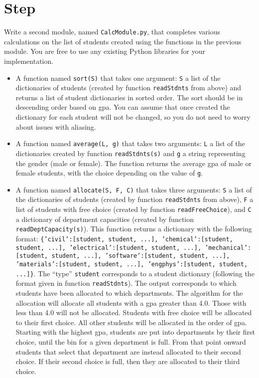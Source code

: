 \documentclass[12pt]{article}
\newcounter{stepnum}
\begin{document}
\section *{Step  \thestepnum}

Write a second module, named {\tt CalcModule.py}, that completes various
calculations on the list of students created using the functions in the previous
module.  You are free to use any existing Python libraries for your
implementation.

\begin{itemize}

\item A function named {\tt sort(S)} that takes one argument: \texttt{S} a list
  of the dictionaries of students (created by function \texttt{readStdnts} from
  above) and returns a list of student dictionaries in sorted order.  The sort
  should be in descending order based on gpa.  You can assume that once created
  the dictionary for each student will not be changed, so you do not need to
  worry about issues with aliasing.

\item A function named {\tt average(L, g)} that takes two arguments: \texttt{L}
  a list of the dictionaries created by function \texttt{readStdnts(s)} and
  \texttt{g} a string representing the gender (male or female).  The function
  returns the average gpa of male or female students, with the choice depending
  on the value of \texttt{g}.

\item A function named {\tt allocate(S, F, C)} that takes three arguments:
  \texttt{S} a list of the dictionaries of students (created by function
  \texttt{readStdnts} from above), \texttt{F} a list of students with free
  choice (created by function {\tt readFreeChoice}), and \texttt{C} a dictionary
  of department capacities (created by function {\tt readDeptCapacity(s)}).
  This function returns a dictionary with the following format:
  \texttt{\{'civil':[student, student, ...], 'chemical':[student, student, ...],
    'electrical':[student, student, ...], 'mechanical':[student, student, ...],
    'software':[student, student, ...], 'materials':[student, student, ...],
    'engphys':[student, student, ...]\}}.  The ``type'' \texttt{student}
  corresponds to a student dictionary (following the format given in function
  \texttt{readStdnts}).  The output corresponds to which students have been
  allocated to which departments.  The algorithm for the allocation will
  allocate all students with a gpa greater than 4.0.  Those with less than 4.0
  will not be allocated.  Students with free choice will be allocated to their
  first choice.  All other students will be allocated in the order of gpa.
  Starting with the highest gpa, students are put into departments by their
  first choice, until the bin for a given department is full.  From that point
  onward students that select that department are instead allocated to their
  second choice.  If their second choice is full, then they are allocated to
  their third choice.

\end{itemize}
\end{document}
